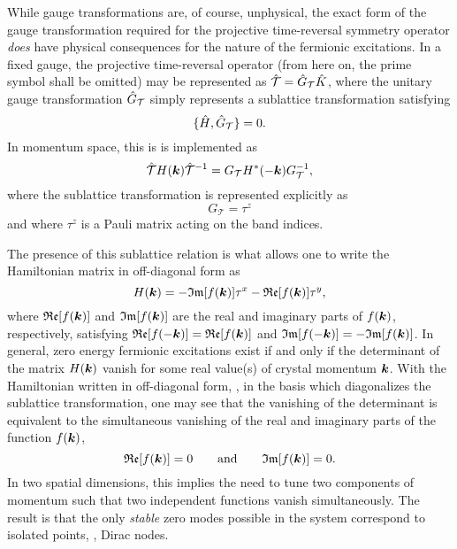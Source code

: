 While gauge transformations are, of course, unphysical, the exact form of the gauge transformation required for the projective time-reversal symmetry operator \textit{does} have physical consequences for the nature of the fermionic excitations.
In a fixed gauge, the projective time-reversal operator (from here on, the prime symbol shall be omitted) may be represented as $\hat{\mathcal{T}} = \hat{G}_{\mathcal{T}} \hat{K}$, where the unitary gauge transformation $\hat{G}_{\mathcal{T}}$ simply represents a sublattice transformation satisfying
%
\begin{equation}
	\{\hat{H}, \hat{G}_\mathcal{T}\} = 0.
\end{equation}
%
In momentum space, this is is implemented as
%
\begin{equation}
	\hat{\mathcal{T}} H(\bm{k}) \hat{\mathcal{T}}^{-1} = G_\mathcal{T} H^*(-\bm{k}) G_\mathcal{T}^{-1},
\end{equation}
%
where the sublattice transformation is represented explicitly as
%
\begin{equation}
	G_\mathcal{T} = \tau^z
\end{equation}
%
and where $\tau^z$ is a Pauli matrix acting on the band indices.

The presence of this sublattice relation is what allows one to write the Hamiltonian matrix in off-diagonal form as
%
\begin{equation}
	H(\bm{k}) = -\mathfrak{Im}[f(\bm{k})] \tau^x - \mathfrak{Re}[f(\bm{k})] \tau^y,
\end{equation}
%
where $\mathfrak{Re}[f(\bm{k})]$ and $\mathfrak{Im}[f(\bm{k})]$ are the real and imaginary parts of $f(\bm{k})$, respectively, satisfying $\mathfrak{Re}[f(-\bm{k})] = \mathfrak{Re}[f(\bm{k})]$ and $\mathfrak{Im}[f(-\bm{k})] = -\mathfrak{Im}[f(\bm{k})]$.
In general, zero energy fermionic excitations exist if and only if the determinant of the matrix $H(\bm{k})$ vanish for some real value(s) of crystal momentum $\bm{k}$.
With the Hamiltonian written in off-diagonal form, \ie, in the basis which diagonalizes the sublattice transformation, one may see that the vanishing of the determinant is equivalent to the simultaneous vanishing of the real and imaginary parts of the function $f(\bm{k})$,
%
\begin{equation}
	\mathfrak{Re}[f(\bm{k})] = 0 \qquad\text{and}\qquad \mathfrak{Im}[f(\bm{k})] = 0.
	\label{eq:chapter02_DetHEqualsZero}
\end{equation}
%
In two spatial dimensions, this implies the need to tune two components of momentum such that two independent functions vanish simultaneously.
The result is that the only \textit{stable} zero modes possible in the system correspond to isolated points, \ie, Dirac nodes.

